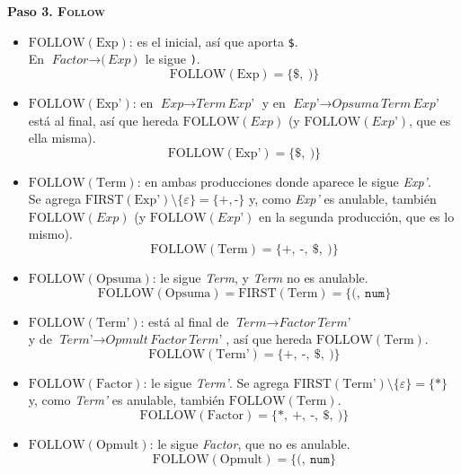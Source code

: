 \documentclass[12pt,letterpaper]{article}
\newcommand{\nt}[1]{\textit{#1}}
\newcommand{\tk}[1]{\texttt{#1}}
\newcommand{\tx}[1]{\text{#1}}
\newcommand{\First}[1]{\mathrm{FIRST}(#1)}
\newcommand{\Follow}[1]{\mathrm{FOLLOW}(#1)}
\newcommand{\eps}{\varepsilon}
\begin{document}
\begin{enumerate}[label=\arabic*.]
\begin{itemize}
    \textbf{Paso 3. \textsc{Follow}}
    \begin{itemize}
    \item $\Follow{\tx{Exp}}$: es el inicial, así que aporta \tk{\$}.\\
      En $\nt{Factor}\to\tk{(}\,\nt{Exp}\,\tk{)}$ le sigue \tk{)}.
      \[
      \Follow{\tx{Exp}} = \{\tk{\$},\ \tk{)}\}
      \]
      
    \item $\Follow{\tx{Exp'}}$: en $\nt{Exp}\to\nt{Term}\,\nt{Exp'}$ y en
      $\nt{Exp'}\to\nt{Opsuma}\,\nt{Term}\,\nt{Exp'}$ está al final, así que hereda
      $\Follow{\nt{Exp}}$ \big(y $\Follow{\nt{Exp'}}$, que es ella misma\big).
      \[
      \Follow{\tx{Exp'}} = \{\tk{\$},\ \tk{)}\}
      \]
      
    \item $\Follow{\tx{Term}}$: en ambas producciones donde aparece le sigue \nt{Exp'}.\\
      Se agrega $\First{\tx{Exp'}}\setminus\{\eps\}=\{\tk{+},\tk{-}\}$ y, como \nt{Exp'} es anulable, también
      $\Follow{\nt{Exp}}$ \big(y $\Follow{\nt{Exp'}}$ en la segunda producción, que es lo mismo\big).
      \[
      \Follow{\tx{Term}} = \{\tk{+},\ \tk{-},\ \tk{\$},\ \tk{)}\}
      \]
      
    \item $\Follow{\tx{Opsuma}}$: le sigue \nt{Term}, y \nt{Term} no es anulable.
      \[
      \Follow{\tx{Opsuma}} = \First{\tx{Term}} = \{\tk{(},\ \tk{num}\}
      \]
      
    \item $\Follow{\tx{Term'}}$: está al final de $\nt{Term}\to\nt{Factor}\,\nt{Term'}$\\
      y de $\nt{Term'}\to\nt{Opmult}\,\nt{Factor}\,\nt{Term'}$, así que hereda $\Follow{\tx{Term}}$.
      \[
      \Follow{\tx{Term'}} = \{\tk{+},\ \tk{-},\ \tk{\$},\ \tk{)}\}
      \]
      
    \item $\Follow{\tx{Factor}}$: le sigue \nt{Term'}. Se agrega $\First{\tx{Term'}}\setminus\{\eps\}=\{\tk{*}\}$ y, como \nt{Term'} es anulable, también $\Follow{\tx{Term}}$.
      \[
      \Follow{\tx{Factor}} = \{\tk{*},\ \tk{+},\ \tk{-},\ \tk{\$},\ \tk{)}\}
      \]
      
    \item $\Follow{\tx{Opmult}}$: le sigue \nt{Factor}, que no es anulable.
      \[
      \Follow{\tx{Opmult}} = \{\tk{(},\ \tk{num}\}
      \]
    \end{itemize}


\end{itemize}
\end{enumerate}
\end{document}
